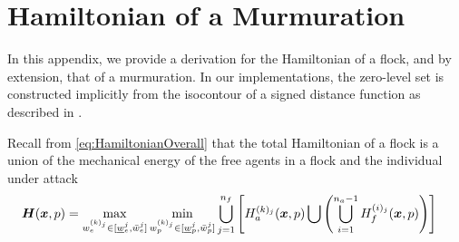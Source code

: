 \section{Hamiltonian of a Murmuration}
\label{app:ham}

In this appendix, we provide a derivation for the Hamiltonian of a flock, and by extension, that of a murmuration. In our implementations, the zero-level set is constructed implicitly from the  isocontour of a signed distance function as described in \cite[Chapter II]{LevelSetsBook}. 
%
%
%

Recall from \eqref{eq:HamiltonianOverall} 
that the total Hamiltonian of a flock is a union of the mechanical energy of the free agents in a flock and the individual under attack \ie
%
\begin{align}
	\bm{H}(\bm{x}, p) &= \max_{w_e^{(k)_j} \in [\underline{w}_e^j, \bar{w}_e^j]}  \min_{w_p^{(k)_j}  \in [\underline{w}_p^{j}, \bar{w}_p^j]} \bigcup_{j=1}^{n_f} \left[ H^{(k)_j}_a(\bm{x}, p) \bigcup \left( \bigcup_{i=1}^{n_a-1} H^{(i)_j}_f(\bm{x}, p) \right) \right] 
\end{align}

